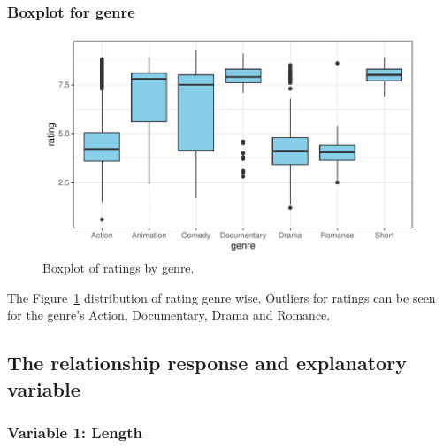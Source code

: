 \documentclass[
  letterpaper,
  DIV=11,
  numbers=noendperiod]{scrartcl}
\begin{document}
\clearpage

\hypertarget{boxplot-for-genre}{%
\subsubsection{Boxplot for genre}\label{boxplot-for-genre}}

\begin{figure}

{\centering \includegraphics{Group_06_Analysis_files/figure-pdf/fig-boxplot-ratings-1.pdf}

}

\caption{\label{fig-boxplot-ratings}Boxplot of ratings by genre.}

\end{figure}

The Figure~\ref{fig-boxplot-ratings} distribution of rating genre wise.
Outliers for ratings can be seen for the genre's Action, Documentary,
Drama and Romance. \clearpage

\hypertarget{the-relationship-response-and-explanatory-variable}{%
\subsection{The relationship response and explanatory
variable}\label{the-relationship-response-and-explanatory-variable}}

\hypertarget{variable-1-length}{%
\subsubsection{Variable 1: Length}\label{variable-1-length}}
\end{document}
